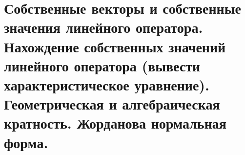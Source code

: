 \section{
    Собственные векторы и собственные значения линейного оператора. Нахождение собственных значений линейного оператора (вывести характеристическое уравнение). Геометрическая и алгебраическая кратность. Жорданова нормальная форма.
}
